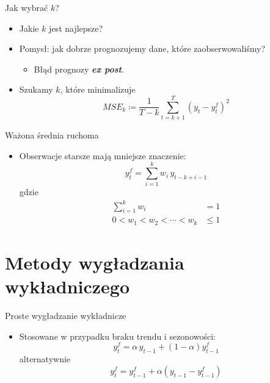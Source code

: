 \documentclass[11pt,usenames,dvipsnames,aspectratio=169]{beamer}
\begin{document}
\begin{frame}{Jak wybrać $k$?}
\begin{itemize}
    \item Jakie $k$ jest najlepsze?
    \item Pomysł: jak dobrze prognozujemy dane, które zaobserwowaliśmy?
    \begin{itemize}
        \item Błąd prognozy \textbf{\emph{ex post}}.
    \end{itemize}
    \item Szukamy $k$, które minimalizuje
    \[
    MSE_{k} \coloneqq \frac{1}{T-k}\sum_{t=k+1}^{T}\left(y_{t}-y_{t}^{f}\right)^{2}
    \]
\end{itemize}
\end{frame}

\begin{frame}{Ważona średnia ruchoma}
\begin{itemize}
    \item Obserwacje starsze mają mniejsze znaczenie:
    \[
    y_{t}^{f}=\sum_{i=1}^{k}w_{i}\,y_{t-k+i-1}
    \]
    gdzie
    \begin{align*}
    \sum_{i=1}^{k}w_{i} &= 1\\
    0<w_{1}<w_{2}<\cdots<w_{k} &\leq 1
    \end{align*}
\end{itemize}
\end{frame}

\section{Metody wygładzania wykładniczego}

\begin{frame}{Proste wygładzanie wykładnicze}
\begin{itemize}
    \item Stosowane w przypadku braku trendu i sezonowości:
    \[
    y_{t}^{f}=\alpha\, y_{t-1}+\left(1-\alpha\right)y_{t-1}^{f}
    \]
    alternatywnie
    \[
    y_{t}^{f} = y_{t-1}^{f}+\alpha\left(y_{t-1}-y_{t-1}^{f}\right)
    \]
\end{itemize}
\end{frame}
\end{document}
